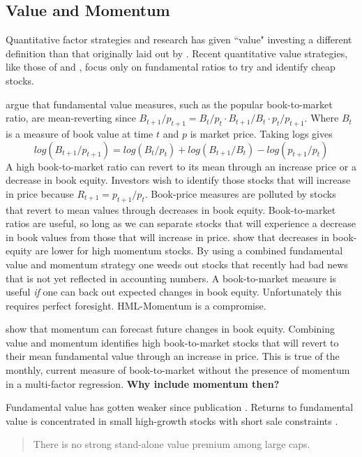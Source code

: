 
\subsection{Value and Momentum}

Quantitative factor strategies and research has given ``value" investing a different 
definition than that originally laid out by \textcite{graham1934security}.
Recent quantitative value strategies, like those of \textcite{lakonishok1994contrarian} and 
\textcite{chan2004value}, focus only on fundamental ratios to try and identify cheap stocks.

\textcite{kok2017facts} argue  that fundamental value measures, such as the popular 
book-to-market ratio, are mean-reverting since
$B_{t+1}/p_{t+1} = B_t/p_t \cdot B_{t+1}/B_t \cdot p_t/p_{t+1}$.
Where $B_t$ is a measure of book value at time $t$ and $p$ is market price.
Taking logs gives
\[
log(B_{t+1}/p_{t+1}) = log(B_{t}/p_{t}) + log(B_{t+1}/B_{t}) - log(p_{t+1}/p_{t})
\]
A high book-to-market ratio can revert to its mean through an increase price or
a decrease in book equity.
Investors wish to identify those stocks that will increase in price because
$R_{t+1}=p_{t+1}/p_{t}$.
Book-price measures are polluted by stocks that revert to mean values through
decreases in book equity.
Book-to-market ratios are useful, so long as we can separate stocks that will
experience a decrease in book values from those that will increase in price.
\textcite{kok2017facts} show that decreases in book-equity are lower for high
momentum stocks.
By using a combined fundamental value and momentum strategy one weeds out stocks that recently 
had bad news that is not yet reflected in accounting numbers.
A book-to-market measure is useful \emph{if} one can back out expected changes in book equity.
Unfortunately this requires perfect foresight.
HML-Momentum is a compromise.

\textcite{asness2013devil} show that momentum can forecast future changes in
book equity.
Combining value and momentum identifies high book-to-market stocks that will
revert to their mean fundamental value through an increase in price.
This is true of the monthly, current measure of book-to-market without the
presence of momentum in a multi-factor regression.
\textbf{Why include momentum then?}

Fundamental value has gotten weaker since publication \parencite{mclean2016does}.
Returns to fundamental value is concentrated in small high-growth stocks with short sale 
constraints \parencite{nagel2005short}.
\textcite{asness2015fact}
\begin{quotation}
  There is no strong stand-alone value premium among large caps.
\end{quotation}
